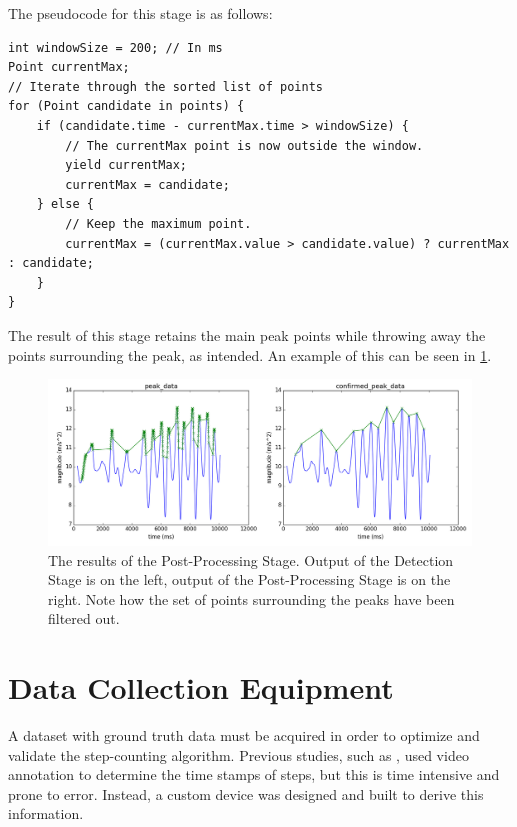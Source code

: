             The pseudocode for this stage is as follows:

            \begin{lstlisting}
int windowSize = 200; // In ms
Point currentMax;
// Iterate through the sorted list of points
for (Point candidate in points) {
    if (candidate.time - currentMax.time > windowSize) {
        // The currentMax point is now outside the window. 
        yield currentMax;
        currentMax = candidate;
    } else {
        // Keep the maximum point.
        currentMax = (currentMax.value > candidate.value) ? currentMax : candidate;
    }
}
            \end{lstlisting}

            The result of this stage retains the main peak points while throwing away the points surrounding the peak, as intended. An example of this can be seen in \ref{img_post_stage}.

            \begin{figure}[!th]
                \includegraphics[width=\textwidth]{Images/post_stage.png}
                \centering
                \caption{The results of the Post-Processing Stage. Output of the Detection Stage is on the left, output of the Post-Processing Stage is on the right. Note how the set of points surrounding the peaks have been filtered out.}
                \label{img_post_stage}
            \end{figure}

    \chapter{Data Collection Equipment}
    \label{sc_device}

        A dataset with ground truth data must be acquired in order to optimize and validate the step-counting algorithm. Previous studies, such as \cite{brajdic}, used video annotation to determine the time stamps of steps, but this is time intensive and prone to error. Instead, a custom device was designed and built to derive this information.

